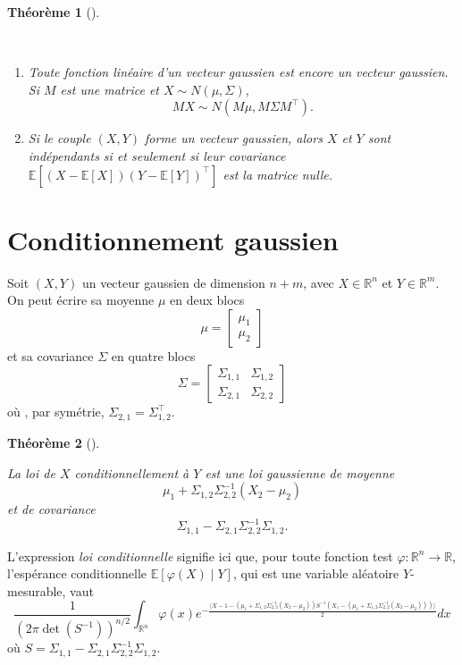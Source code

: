 \documentclass[
  10,
  letterpaper,
  DIV=11,
  numbers=noendperiod]{scrreport}
\theoremstyle{plain}
\newtheorem{theorem}{Théorème}[chapter]
\theoremstyle{definition}
\theoremstyle{plain}
\theoremstyle{definition}
\theoremstyle{definition}
\theoremstyle{plain}
\theoremstyle{remark}
\begin{document}
\begin{theorem}[]\protect\hypertarget{thm-vecgauss}{}\label{thm-vecgauss}

~

\begin{enumerate}
\def\labelenumi{\arabic{enumi}.}
\item
  Toute fonction linéaire d'un vecteur gaussien est encore un vecteur
  gaussien. Si \(M\) est une matrice et \(X \sim N(\mu,\Sigma)\),
  \[MX \sim N(M\mu, M\Sigma M^\top). \]
\item
  Si le couple \((X,Y)\) forme un vecteur gaussien, alors \(X\) et \(Y\)
  sont indépendants si et seulement si leur covariance
  \(\mathbb{E}[(X-\mathbb{E}[X])(Y-\mathbb{E}[Y])^\top]\) est la matrice
  nulle.
\end{enumerate}

\end{theorem}

\hypertarget{conditionnement-gaussien}{%
\section{Conditionnement gaussien}\label{conditionnement-gaussien}}

Soit \((X,Y)\) un vecteur gaussien de dimension \(n+m\), avec
\(X \in \mathbb{R}^n\) et \(Y \in \mathbb{R}^m\). On peut écrire sa
moyenne \(\mu\) en deux blocs
\[ \mu = \begin{bmatrix}\mu_1 \\ \mu_2 \end{bmatrix}\] et sa covariance
\(\Sigma\) en quatre blocs
\[ \Sigma = \begin{bmatrix}\Sigma_{1,1} & \Sigma_{1,2} \\ \Sigma_{2,1} & \Sigma_{2,2} \end{bmatrix}\]
où , par symétrie, \(\Sigma_{2,1} = \Sigma_{1,2}^\top\).

\begin{theorem}[]\protect\hypertarget{thm-condgaussien}{}\label{thm-condgaussien}

La loi de \(X\) conditionnellement à \(Y\) est une loi gaussienne de
moyenne \[\mu_1 + \Sigma_{1,2}\Sigma_{2,2}^{-1}(X_2-\mu_2) \] et de
covariance
\[ \Sigma_{1,1} - \Sigma_{2,1}\Sigma_{2,2}^{-1}\Sigma_{1,2}.\]

\end{theorem}

L'expression \emph{loi conditionnelle} signifie ici que, pour toute
fonction test \(\varphi : \mathbb{R}^n \to \mathbb{R}\), l'espérance
conditionnelle \(\mathbb{E}[\varphi(X)\mid Y]\), qui est une variable
aléatoire \(Y\)-mesurable, vaut
\[\frac{1}{(2\pi \det(S^{-1}))^{n/2}}\int_{\mathbb{R}^n} \varphi(x) e^{-\frac{\langle X-1 - (\mu_1 + \Sigma_{1,2}\Sigma_{2,2}^{-1}(X_2-\mu_2)) S^{-1}(X_1 - (\mu_1 + \Sigma_{1,2}\Sigma_{2,2}^{-1}(X_2-\mu_2)))\rangle}{2}}dx \]
où \(S = \Sigma_{1,1} - \Sigma_{2,1}\Sigma_{2,2}^{-1}\Sigma_{1,2}\).
\end{document}
